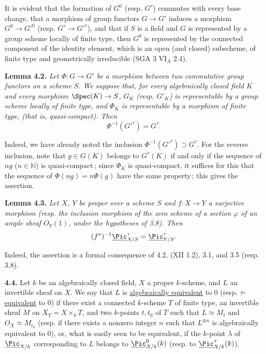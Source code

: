 It is evident that the formation of \(G^0\) (resp. \(G^\tau\)) commutes with every base change, that a morphism of group functors \(G\to G'\) induces a morphism \(G^0\to G'^0\) (resp. \(G^\tau\to G'^\tau\)), and that if \(S\) is a field and \(G\) is represented by a group scheme locally of finite type, then \(G^0\) is represented by the connected component of the identity element, which is an open (and closed) subscheme, of finite type and geometrically irreducible (SGA 3 VI\(_A\) 2.4).

\textbf{Lemma 4.2.} \emph{Let \(\Phi:G\to G'\) be a morphism between two commutative group functors on a scheme \(S\). We suppose that, for every algebraically closed field \(K\) and every morphism \(\Spec(K)\to S\), \(G_K\) (resp. \(G'_K\)) is representable by a group scheme locally of finite type, and \(\Phi_K\) is representable by a morphism of finite type, (that is, quasi-compact). Then}
\[
  \Phi^{-1}(G'^\tau)=G^\tau.
\]

%
Indeed, we have already noted the inclusion \(\Phi^{-1}(G'^\tau)\supset G^\tau\). For the reverse inclusion, note that \(g\in G(K)\) belongs to \(G^\tau(K)\) if and only if the sequence of \(ng\) (\(n\in\mathbb N\)) is quasi-compact\,; since \(\Phi_K\) is quasi-compact, it suffices for this that the sequence of \(\Phi(ng)=n\Phi(g)\) have the same property\,; this gives the assertion.

\textbf{Lemma 4.3.} \emph{Let \(X\), \(Y\) be proper over a scheme \(S\) and \(f:X\to Y\) a surjective morphism (resp. the inclusion morphism of the zero scheme of a section \(\varphi\) of an ample sheaf \({O}_Y(1)\), under the hypotheses of 3.8). Then}
\[
  (f^*)^{-1}\underline{\Pic}^\tau_{X/S}=\underline{\Pic}^\tau_{Y/S}.
\]

Indeed, the assertion is a formal consequence of 4.2, (XII 1.2), 3.1, and 3.5 (resp. 3.8).

\textbf{4.4.} Let \(k\) be an algebraically closed field, \(X\) a proper \(k\)-scheme, and \(L\) an invertible sheaf on \(X\). We say that \(L\) is \uline{algebraically equivalent} to \(0\) (resp. \(\tau\)-\uline{equivalent} to \(0\)) if there exist a connected \(k\)-scheme \(T\) of finite type, an invertible sheaf \(M\) on \(X_T=X\times_k T\), and two \(k\)-points \(t,t_0\) of \(T\) such that \(L\simeq M_t\) and \({O}_X\simeq M_{t_0}\) (resp. if there exists a nonzero integer \(n\) such that \(L^{\otimes n}\) is algebraically equivalent to \(0\)), or, what is easily seen to be equivalent, if the \(k\)-point \(\lambda\) of \(\underline{\Pic}_{X/k}\) corresponding to \(L\) belongs to \(\underline{\Pic}^0_{X/k}(k)\) (resp. to \(\underline{\Pic}^\tau_{X/k}(k)\)).

